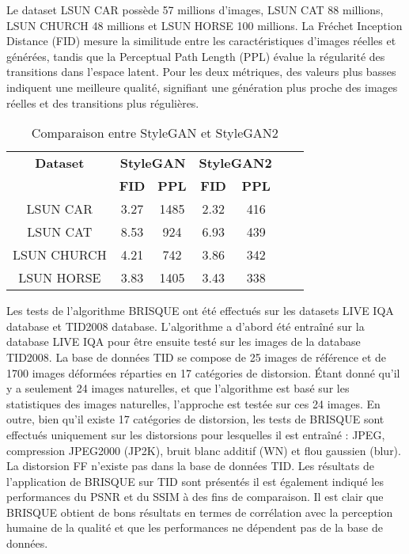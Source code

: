 \documentclass{ieeeaccess}
\begin{document}
 Le dataset LSUN CAR possède 57 millions d’images, LSUN CAT 88 millions, LSUN CHURCH 48 millions et LSUN HORSE 100 millions. La Fréchet Inception Distance (FID) mesure la similitude entre les caractéristiques d'images réelles et générées, tandis que la Perceptual Path Length (PPL) évalue la régularité des transitions dans l'espace latent. Pour les deux métriques, des valeurs plus basses indiquent une meilleure qualité, signifiant une génération plus proche des images réelles et des transitions plus régulières. 

\begin{table}[h]
\caption{Comparaison entre StyleGAN et StyleGAN2}
\label{table}
\setlength{\tabcolsep}{12pt}
\begin{tabular}{|c|c|c|c|c|c|c|}
    \hline
    \textbf{Dataset} & \multicolumn{2}{c|}{\textbf{StyleGAN}} & \multicolumn{2}{c|}{\textbf{StyleGAN2}} \\
    \cline{2-5}
    & \textbf{FID} & \textbf{PPL} & \textbf{FID} & \textbf{PPL} \\
    \hline
    LSUN CAR & 3.27 & 1485 & 2.32 & 416 \\
    LSUN CAT & 8.53 & 924 & 6.93 & 439 \\
    LSUN CHURCH & 4.21 & 742 & 3.86 & 342 \\
    LSUN HORSE & 3.83 & 1405 & 3.43 & 338 \\
    \hline
\end{tabular}
\end{table}

 Les tests de l’algorithme BRISQUE ont été effectués sur les datasets LIVE IQA database et TID2008 database. L’algorithme a d’abord été entraîné sur la database LIVE IQA pour être ensuite testé sur les images de la database TID2008. La base de données TID se compose de 25 images de référence et de 1700 images déformées réparties en 17 catégories de distorsion. Étant donné qu'il y a seulement 24 images naturelles, et que l’algorithme est basé sur les statistiques des images naturelles, l'approche est testée sur ces 24 images. En outre, bien qu'il existe 17 catégories de distorsion, les tests de BRISQUE sont effectués uniquement sur les distorsions pour lesquelles il est entraîné : JPEG, compression JPEG2000 (JP2K), bruit blanc additif (WN) et flou gaussien (blur). La distorsion FF n'existe pas dans la base de données TID. Les résultats de l'application de BRISQUE sur TID sont présentés il est également indiqué les performances du PSNR et du SSIM à des fins de comparaison. Il est clair que BRISQUE obtient de bons résultats en termes de corrélation avec la perception humaine de la qualité et que les performances ne dépendent pas de la base de données.
\end{document}
